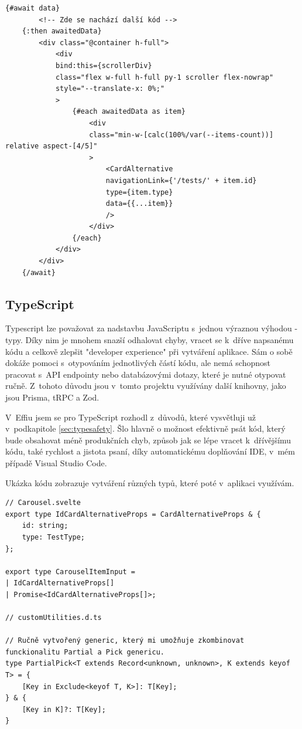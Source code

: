 \documentclass[12pt, a4paper,
openright
]{report}
\begin{document}
\begin{enumerate}
	\begin{lstlisting}[style=ES6, caption=Ukázka Svelte kódu, label=svelte-sample]
	{#await data}
		<!-- Zde se nachází další kód -->
	{:then awaitedData}
		<div class="@container h-full">
			<div
			bind:this={scrollerDiv}
			class="flex w-full h-full py-1 scroller flex-nowrap"
			style="--translate-x: 0%;"
			>
				{#each awaitedData as item}
					<div
					class="min-w-[calc(100%/var(--items-count))] relative aspect-[4/5]"
					>
						<CardAlternative
						navigationLink={'/tests/' + item.id}
						type={item.type}
						data={{...item}}
						/>
					</div>
				{/each}
			</div>
		</div>
	{/await}\end{lstlisting}
\end{enumerate}

\subsection{TypeScript}
Typescript lze považovat za nadstavbu JavaScriptu s~jednou výraznou výhodou - typy. Díky nim je mnohem snazší odhalovat chyby, vracet se k~dříve napsanému kódu a celkově zlepšit "developer experience" při vytváření aplikace. Sám o sobě dokáže pomoci s~otypováním jednotlivých částí kódu, ale nemá schopnost pracovat s~API endpointy nebo databázovými dotazy, které je nutné otypovat ručně. Z~tohoto důvodu jsou v~tomto projektu využívány další knihovny, jako jsou Prisma, tRPC a Zod.

V~Effiu jsem se pro TypeScript rozhodl z~důvodů, které vysvětluji už v~podkapitole \ref{sec:typesafety}. Šlo hlavně o možnost efektivně psát kód, který bude obsahovat méně produkčních chyb, způsob jak se lépe vracet k~dřívějšímu kódu, také rychlost a jistota psaní, díky automatickému doplňování IDE, v~mém případě Visual Studio Code.

Ukázka kódu zobrazuje vytváření různých typů, které poté v~aplikaci využívám.

\begin{lstlisting}[style=ES6, caption=Ukázka TypeScriptového typu, label=typescript-sample]
// Carousel.svelte
export type IdCardAlternativeProps = CardAlternativeProps & {
	id: string;
	type: TestType;
};

export type CarouselItemInput =
| IdCardAlternativeProps[]
| Promise<IdCardAlternativeProps[]>;

// customUtilities.d.ts

// Ručně vytvořený generic, který mi umožňuje zkombinovat funckionalitu Partial a Pick genericu. 
type PartialPick<T extends Record<unknown, unknown>, K extends keyof T> = {
	[Key in Exclude<keyof T, K>]: T[Key];
} & {
	[Key in K]?: T[Key];
}
\end{lstlisting}
\end{document}
